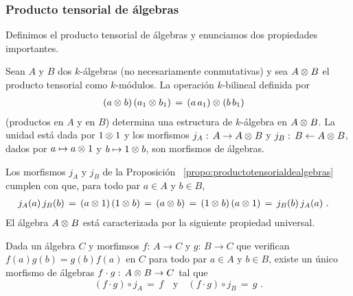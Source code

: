 \subsubsection{Producto tensorial de \'{a}lgebras}

Definimos el producto tensorial de \'{a}lgebras y enunciamos dos propiedades
importantes.

\begin{propoProductoTensorialDeAlgebras}%
	\label{propo:productotensorialdealgebras}
	Sean $A$ y $B$ dos $k$-\'{a}lgebras (no necesariamente conmutativas) y
	sea $A\otimes_{} B$ el producto tensorial como $k$-m\'{o}dulos. La
	operaci\'{o}n $k$-bilineal definida por
	\begin{align*}
		(a\otimes_{} b)\,(a_1\otimes_{} b_1) & \,=\,(a\,a_1)\otimes_{} (b\,b_1)
	\end{align*}
	(productos en $A$ y en $B$) determina una estructura de $k$-\'{a}lgebra
	en $A\otimes_{} B$. La unidad est\'{a} dada por $1\otimes_{} 1$ y los
	morfismos $j_A:\,A\rightarrow A\otimes_{} B$ y
	$j_B:\,B\leftarrow A\otimes_{} B$, dados por $a\mapsto a\otimes_{} 1$ y
	$b\mapsto 1\otimes_{} b$, son morfismos de \'{a}lgebras.
\end{propoProductoTensorialDeAlgebras}

Los morfismos $j_A$ y $j_B$ de la Proposici\'{o}n~%
\ref{propo:productotensorialdealgebras} cumplen con que, para todo par $a\in A$
y $b\in B$,
\begin{align*}
	j_A(a)\,j_B(b) & \,=\,(a\otimes_{} 1)\,(1\otimes_{} b)\,=\,(a\otimes_{} b)\,=\,
		(1\otimes_{} b)\,(a\otimes_{} 1)\,=\,j_B(b)\,j_A(a)
	\text{ .}
\end{align*}
%
El \'{a}lgebra $A\otimes_{} B$ est\'{a} caracterizada por la siguiente propiedad
universal.

\begin{propoProductoTensorialDeAlgebras}%
	\label{propo:productotensorialdealgebrasuniversal}
	Dada un \'{a}lgebra $C$ y morfimsos $f:\,A\rightarrow C$ y
	$g:\,B\rightarrow C$ que verifican $f(a)g(b)=g(b)f(a)$ en $C$ para todo
	par $a\in A$ y $b\in B$, existe un \'{u}nico morfismo de \'{a}lgebras
	$f\cdot g:\,A\otimes_{} B\rightarrow C$ tal que
	\begin{equation}
		\label{eq:productotensorialdemorfismosdealgebras}
		(f\cdot g)\circ j_A\,=\,f \quad\text{y}\quad
			(f\cdot g)\circ j_B \,=\,g
		\text{ .}
	\end{equation}
\end{propoProductoTensorialDeAlgebras}


